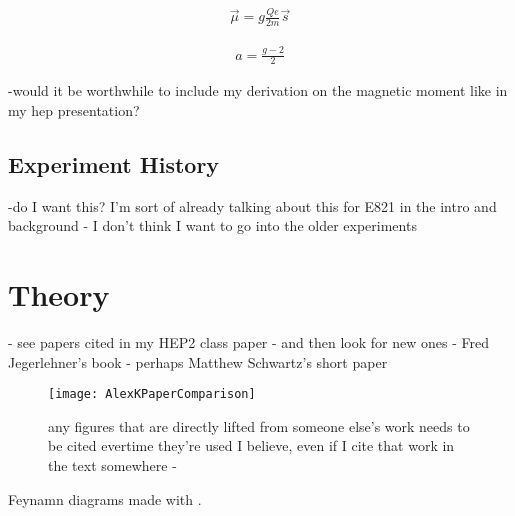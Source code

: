 		\begin{align} \label{eq:magneticmoment}
            \vec{\mu} = g \frac{Qe}{2m} \vec{s}
		\end{align}

		\begin{align} \label{eq:anamoly}
            a = \frac{g-2}{2}
		\end{align}


-would it be worthwhile to include my derivation on the magnetic moment like in my hep presentation?



\subsection{Experiment History}
\label{subsec:ExperimentHistory}

-do I want this? I'm sort of already talking about this for E821 in the intro and background - I don't think I want to go into the older experiments



\section{Theory}
\label{sec:Theory}

- see papers cited in my HEP2 class paper - and then look for new ones
- Fred Jegerlehner's book
- perhaps Matthew Schwartz's short paper 



\begin{figure}[]
	\centering
	\texttt{[image: AlexKPaperComparison]}
	\caption[AlexKPaperComparison]{any figures that are directly lifted from someone else's work needs to be cited evertime they're used I believe, even if I cite that work in the text somewhere - \cite{Keshavarzi:2018mgv} }
	\label{fig:AlexKPaperComparison}
\end{figure}

Feynamn diagrams made with \cite{tikz-feynman,tikz-feynhand}.

